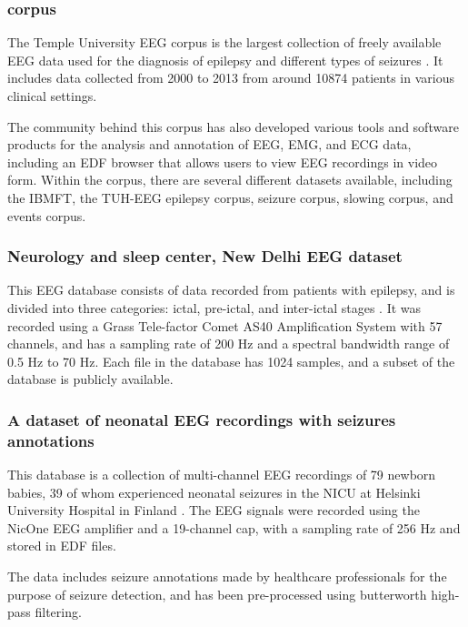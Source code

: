 \subsubsection{ corpus}
The Temple University \gls{EEG} corpus is the largest collection of freely available \gls{EEG} data used for the diagnosis of epilepsy and different types of seizures \cite{obeid_temple_2016}. It includes data collected from 2000 to 2013 from around 10874 patients in various clinical settings. 

The community behind this corpus has also developed various tools and software products for the analysis and annotation of \gls{EEG}, \gls{EMG}, and \gls{ECG} data, including an \gls{EDF} browser that allows users to view \gls{EEG} recordings in video form. Within the corpus, there are several different datasets available, including the \gls{IBMFT}, the \gls{TUH-EEG} epilepsy corpus, seizure corpus, slowing corpus, and events corpus.

\subsubsection{Neurology and sleep center, New Delhi EEG dataset}
This \gls{EEG} database consists of data recorded from patients with epilepsy, and is divided into three categories: ictal, pre-ictal, and inter-ictal stages \cite{swami_eeg_2016}. It was recorded using a Grass Tele-factor Comet AS40 Amplification System with 57 channels, and has a sampling rate of 200 Hz and a spectral bandwidth range of 0.5 Hz to 70 Hz. Each file in the database has 1024 samples, and a subset of the database is publicly available.

\subsubsection{A dataset of neonatal EEG recordings with seizures annotations}
This database is a collection of multi-channel \gls{EEG} recordings of 79 newborn babies, 39 of whom experienced neonatal seizures in the \gls{NICU} at Helsinki University Hospital in Finland \cite{stevenson_dataset_2018}. The \gls{EEG} signals were recorded using the NicOne \gls{EEG} amplifier and a 19-channel cap, with a sampling rate of 256 Hz and stored in \gls{EDF} files. 

The data includes seizure annotations made by healthcare professionals for the purpose of seizure detection, and has been pre-processed using butterworth high-pass filtering.

